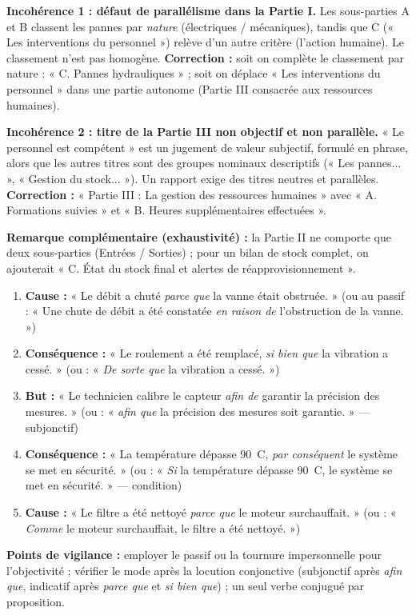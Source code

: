 \documentclass[11pt]{article}
\begin{document}
\begin{corrige}
\textbf{Incohérence 1 : défaut de parallélisme dans la Partie I.} Les sous-parties A et B classent les pannes par \emph{nature} (électriques / mécaniques), tandis que C (« Les interventions du personnel ») relève d'un autre critère (l'action humaine). Le classement n'est pas homogène.
\textbf{Correction :} soit on complète le classement par nature : « C. Pannes hydrauliques » ; soit on déplace « Les interventions du personnel » dans une partie autonome (Partie III consacrée aux ressources humaines).

\textbf{Incohérence 2 : titre de la Partie III non objectif et non parallèle.} « Le personnel est compétent » est un jugement de valeur subjectif, formulé en phrase, alors que les autres titres sont des groupes nominaux descriptifs (« Les pannes... », « Gestion du stock... »). Un rapport exige des titres neutres et parallèles.
\textbf{Correction :} « Partie III : La gestion des ressources humaines » avec « A. Formations suivies » et « B. Heures supplémentaires effectuées ».

\textbf{Remarque complémentaire (exhaustivité) :} la Partie II ne comporte que deux sous-parties (Entrées / Sorties) ; pour un bilan de stock complet, on ajouterait « C. État du stock final et alertes de réapprovisionnement ».
\end{corrige}

\begin{corrige}
\begin{enumerate}
    \item \textbf{Cause :} « Le débit a chuté \emph{parce que} la vanne était obstruée. » (ou au passif : « Une chute de débit a été constatée \emph{en raison de} l'obstruction de la vanne. »)
    \item \textbf{Conséquence :} « Le roulement a été remplacé, \emph{si bien que} la vibration a cessé. » (ou : « \emph{De sorte que} la vibration a cessé. »)
    \item \textbf{But :} « Le technicien calibre le capteur \emph{afin de} garantir la précision des mesures. » (ou : « \emph{afin que} la précision des mesures soit garantie. » — subjonctif)
    \item \textbf{Conséquence :} « La température dépasse 90~\textdegree C, \emph{par conséquent} le système se met en sécurité. » (ou : « \emph{Si} la température dépasse 90~\textdegree C, le système se met en sécurité. » — condition)
    \item \textbf{Cause :} « Le filtre a été nettoyé \emph{parce que} le moteur surchauffait. » (ou : « \emph{Comme} le moteur surchauffait, le filtre a été nettoyé. »)
\end{enumerate}

\textbf{Points de vigilance :} employer le passif ou la tournure impersonnelle pour l'objectivité ; vérifier le mode après la locution conjonctive (subjonctif après \emph{afin que}, indicatif après \emph{parce que} et \emph{si bien que}) ; un seul verbe conjugué par proposition.
\end{corrige}
\end{document}
